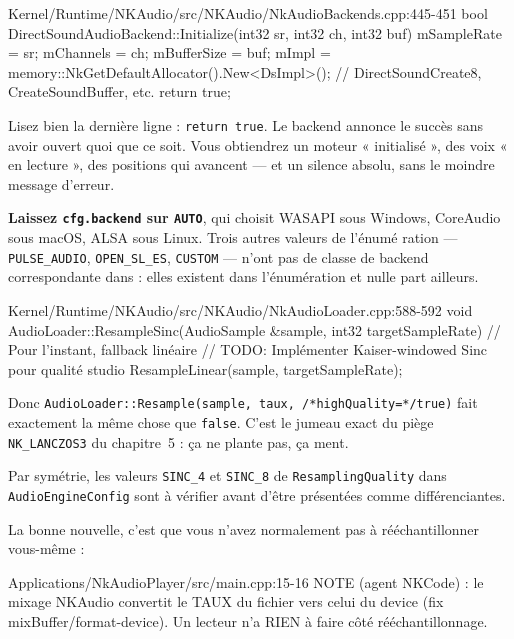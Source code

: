 \begin{nkpiege}
\begin{nkcode}{Kernel/Runtime/NKAudio/src/NKAudio/NkAudioBackends.cpp:445-451}
        bool DirectSoundAudioBackend::Initialize(int32 sr, int32 ch, int32 buf) {
            mSampleRate = sr;
            mChannels = ch;
            mBufferSize = buf;
            mImpl = memory::NkGetDefaultAllocator().New<DsImpl>();
            // DirectSoundCreate8, CreateSoundBuffer, etc.
            return true;
        }
\end{nkcode}

Lisez bien la dernière ligne : \texttt{return true}. Le backend annonce le
succès sans avoir ouvert quoi que ce soit. Vous obtiendrez un moteur
« initialisé », des voix « en lecture », des positions qui avancent — et un
silence absolu, sans le moindre message d'erreur.

\textbf{Laissez \texttt{cfg.backend} sur \texttt{AUTO}}, qui choisit WASAPI sous
Windows, CoreAudio sous macOS, ALSA sous Linux. Trois autres valeurs de l'énumé\-
ration — \texttt{PULSE\_AUDIO}, \texttt{OPEN\_SL\_ES}, \texttt{CUSTOM} — n'ont
pas de classe de backend correspondante dans
 : elles existent dans l'énumération et nulle part
ailleurs.
\end{nkpiege}

\begin{nkpiege}
\begin{nkcode}{Kernel/Runtime/NKAudio/src/NKAudio/NkAudioLoader.cpp:588-592}
        void AudioLoader::ResampleSinc(AudioSample &sample, int32 targetSampleRate) {
            // Pour l'instant, fallback linéaire
            // TODO: Implémenter Kaiser-windowed Sinc pour qualité studio
            ResampleLinear(sample, targetSampleRate);
        }
\end{nkcode}

Donc \texttt{AudioLoader::Resample(sample, taux, /*highQuality=*/true)} fait
exactement la même chose que \texttt{false}. C'est le jumeau exact du piège
\texttt{NK\_LANCZOS3} du chapitre~5 : ça ne plante pas, ça ment.

Par symétrie, les valeurs \texttt{SINC\_4} et \texttt{SINC\_8} de
\texttt{ResamplingQuality} dans \texttt{AudioEngineConfig} sont à vérifier avant
d'être présentées comme différenciantes.

La bonne nouvelle, c'est que vous n'avez normalement pas à rééchantillonner
vous-même :

\begin{nkcode}{Applications/NkAudioPlayer/src/main.cpp:15-16}
 NOTE (agent NKCode) : le mixage NKAudio convertit le TAUX du fichier vers celui du
 device (fix mixBuffer/format-device). Un lecteur n'a RIEN à faire côté rééchantillonnage.
\end{nkcode}
\end{nkpiege}

